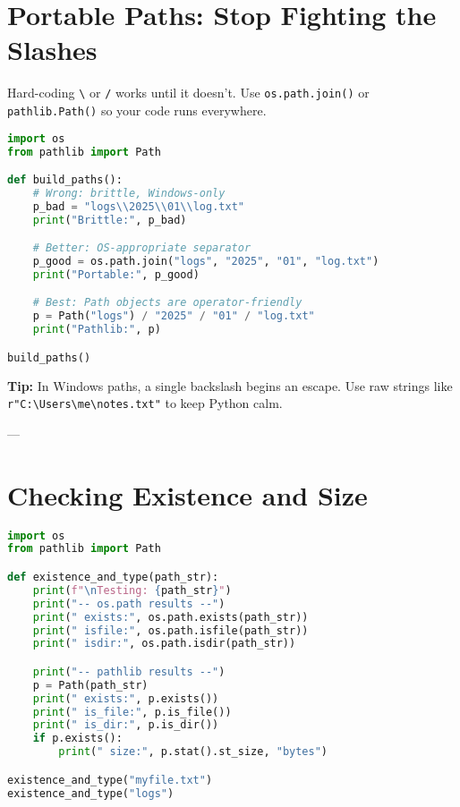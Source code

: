 \section{Portable Paths: Stop Fighting the Slashes}

Hard-coding \verb|\| or \verb|/| works until it doesn’t.
Use \texttt{os.path.join()} or \texttt{pathlib.Path()} so your code runs everywhere.

\begin{lstlisting}[language=Python, caption={Building file paths the right way.}]
import os
from pathlib import Path

def build_paths():
    # Wrong: brittle, Windows-only
    p_bad = "logs\\2025\\01\\log.txt"
    print("Brittle:", p_bad)

    # Better: OS-appropriate separator
    p_good = os.path.join("logs", "2025", "01", "log.txt")
    print("Portable:", p_good)

    # Best: Path objects are operator-friendly
    p = Path("logs") / "2025" / "01" / "log.txt"
    print("Pathlib:", p)

build_paths()
\end{lstlisting}

\textbf{Tip:} In Windows paths, a single backslash begins an escape.
Use raw strings like \verb|r"C:\Users\me\notes.txt"| to keep Python calm.

---

\section{Checking Existence and Size}

\begin{lstlisting}[language=Python, caption={Check if something exists, and what kind of thing it is.}]
import os
from pathlib import Path

def existence_and_type(path_str):
    print(f"\nTesting: {path_str}")
    print("-- os.path results --")
    print(" exists:", os.path.exists(path_str))
    print(" isfile:", os.path.isfile(path_str))
    print(" isdir:", os.path.isdir(path_str))

    print("-- pathlib results --")
    p = Path(path_str)
    print(" exists:", p.exists())
    print(" is_file:", p.is_file())
    print(" is_dir:", p.is_dir())
    if p.exists():
        print(" size:", p.stat().st_size, "bytes")

existence_and_type("myfile.txt")
existence_and_type("logs")
\end{lstlisting}

